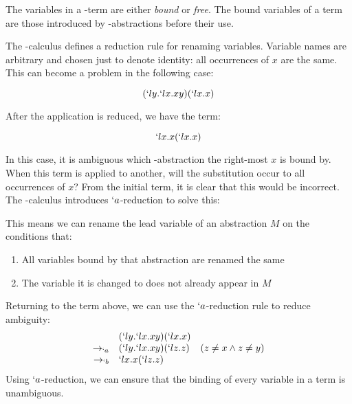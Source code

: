   The variables in a \lam-term are either \emph{bound} or \emph{free}. 
  The bound variables of a term are those introduced by \lam-abstractions before their use.
 
 
  The \lam-calculus defines a reduction rule for renaming variables.
  Variable names are arbitrary and chosen just to denote identity:
  all occurrences of $x$ are the same. This can become a problem
  in the following case:
  
  \[
    (`ly.`lx.xy)(`lx.x)
  \]
 
  After the application is reduced, we have the term:
  
  \[
    `lx.x(`lx.x) 
  \]
  
  In this case, it is ambiguous which \lam-abstraction the right-most $x$
  is bound by. When this term is applied to another, will the substitution
  occur to all occurrences of $x$? From the initial term, it is clear that
  this would be incorrect. The \lam-calculus introduces $`a$-reduction to
  solve this:
  \begin{figure}[H]
  \end{figure}
  This means we can rename the lead variable of an abstraction $M$ on the 
  conditions that: 
  \begin{enumerate}
    \item All variables bound by that abstraction are renamed the same 
    \item The variable it is changed to does not already appear in $M$ 
  \end{enumerate}
  Returning to the term above, we can use the $`a$-reduction rule to reduce ambiguity:
  \[
  \begin{array}{rll}
             & (`ly.`lx.xy)(`lx.x) \\
    \to_{`a} & (`ly.`lx.xy)(`lz.z) & (z \not= x \land z \not= y) \\
    \to_{`b} & `lx.x(`lz.z)
  \end{array}
  \]
  Using $`a$-reduction, we can ensure that the binding of every variable in a term is unambiguous.
  
